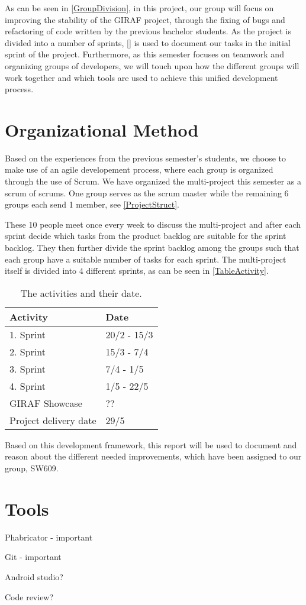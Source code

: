 As can be seen in \autoref{GroupDivision}, in this project, our group will focus
on improving the stability of the GIRAF project, through the fixing of bugs and
refactoring of code written by the previous bachelor students. As the project is
divided into a number of sprints, \autoref{} is used to document our tasks in
the initial sprint of the project. Furthermore, as this semester focuses on
teamwork and organizing groups of developers, we will touch upon how the
different groups will work together and which tools are used to achieve this
unified development process.

\section{Organizational Method}

Based on the experiences from the previous semester's students, we choose to
make use of an agile developement process, where each group is organized
through the use of Scrum. We have organized the multi-project this semester as
a scrum of scrums. One group serves as the scrum master while the remaining 6
groups each send 1 member, see \autoref{ProjectStruct}.


These 10 people meet once every week to discuss the multi-project and after each
sprint decide which tasks from the product backlog are suitable for the sprint
backlog. They then further divide the sprint backlog among the groups such that
each group have a suitable number of tasks for each sprint. The multi-project
itself is divided into 4 different sprints, as can be seen in
\autoref{TableActivity}. 

\begin{table}[H]
\centering
\begin{tabular}{|l|l|}
\hline
Activity & Date \\ \hline
1. Sprint & 20/2 - 15/3 \\\hline 
2. Sprint & 15/3 - 7/4\\\hline 
3. Sprint & 7/4 - 1/5\\\hline 
4. Sprint & 1/5 - 22/5\\\hline 
GIRAF Showcase & ??\\\hline
Project delivery date & 29/5\\\hline
\end{tabular}
\caption{The activities and their date.}
\label{TableActivity}
\end{table}

Based on this development framework, this report will be used to document and
reason about the different needed improvements, which have been assigned to our
group, SW609.


\section{Tools}

Phabricator - important

Git - important

Android studio?

Code review?
